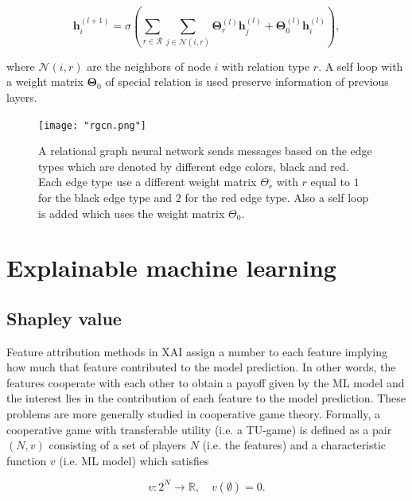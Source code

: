 \begin{equation}
	\pmb{h}^{(l+1)}_i = \sigma \left( \sum_{r \in \mathcal{R}} \sum_{j \in \mathcal{N}(i, r)} \pmb{\Theta}^{(l)}_r \pmb{h}^{(l)}_j
	+ \pmb{\Theta}^{(l)}_0 \pmb{h}^{(l)}_i \right),
\end{equation}


where $\mathcal{N}(i, r)$ are the neighbors of node $i$ with relation type $r$.
A self loop with a weight matrix $\pmb{\Theta}_0$ of special relation
is used preserve information of previous layers.

\begin{figure}[h]
    \centering 
    \texttt{[image: "rgcn.png"]}
    \caption{A relational graph neural network sends messages based on the edge 
    types which are denoted by different edge colors, black and red. Each edge 
    type use a different weight matrix $\Theta_r$ with $r$ equal to $1$ for the black 
    edge type and $2$ for the red edge type. Also a self loop is added which uses 
    the weight matrix $\Theta_0$.}
    \label{fig:rgcn}
\end{figure}


\section{Explainable machine learning}


\subsection{Shapley value}
\label{subsec:shapley_value}

Feature attribution methods in XAI assign a number to each feature implying how
much that feature contributed to the model prediction.\cite{merrick2020explanation}
In other words, the features cooperate with each other to obtain a payoff given
by the ML model and the interest lies in the contribution of each feature to the
model prediction. These problems are more generally studied in cooperative game
theory.\cite{branzei2008models} Formally, a cooperative game with transferable utility (i.e. a TU-game) is
defined as a pair $(N, v)$ consisting of a set of players $N$ (i.e. the features)
and a characteristic function $v$ (i.e. ML model) which satisfies\cite{zhang2022gstarx}


\begin{equation}
	v: 2^N \rightarrow \mathbb{R}, \quad v\left(\emptyset\right) = 0.
\end{equation}


